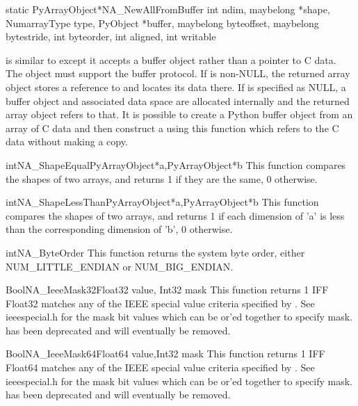 \begin{cfuncdesc}{static PyArrayObject*}{NA_NewAllFromBuffer}{%
    int ndim, maybelong *shape, NumarrayType type, PyObject *buffer, maybelong
    byteoffset, maybelong bytestride, int byteorder, int aligned, int
    writable}%

    is similar to  except it
   accepts a buffer object rather than a pointer to C data.  The 
   object must support the buffer protocol.  If  is non-NULL, the
   returned array object stores a reference to  and locates its
   data there.  If  is specified as NULL, a buffer object and
   associated data space are allocated internally and the returned array object
   refers to that.  It is possible to create a Python buffer object from an
   array of C data and then construct a  using this function
   which refers to the C data without making a copy.
\end{cfuncdesc}

\begin{cfuncdesc}{int}{NA_ShapeEqual}{PyArrayObject*a,PyArrayObject*b}
This function compares the shapes of two arrays, and returns 1 if they
are the same, 0 otherwise.
\end{cfuncdesc}

\begin{cfuncdesc}{int}{NA_ShapeLessThan}{PyArrayObject*a,PyArrayObject*b}
This function compares the shapes of two arrays, and returns 1 if each
dimension of 'a' is less than the corresponding dimension of 'b', 0 otherwise.
\end{cfuncdesc}

\begin{cfuncdesc}{int}{NA_ByteOrder}{}
This function returns the system byte order, either NUM_LITTLE_ENDIAN or
NUM_BIG_ENDIAN.
\end{cfuncdesc}

\begin{cfuncdesc}{Bool}{NA_IeeeMask32}{Float32 value, Int32 mask}
This function returns 1 IFF Float32  matches any of the IEEE special
value criteria specified by .  See ieeespecial.h for the mask bit
values which can be or'ed together to specify mask.
 has been deprecated and will eventually be removed.
\end{cfuncdesc}

\begin{cfuncdesc}{Bool}{NA_IeeeMask64}{Float64 value,Int32 mask}
This function returns 1 IFF Float64  matches any of the IEEE special
value criteria specified by .  See ieeespecial.h for the mask bit
values which can be or'ed together to specify mask.
 has been deprecated and will eventually be removed.
\end{cfuncdesc}

